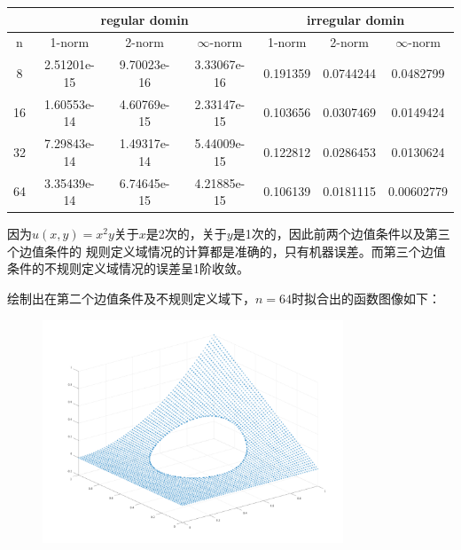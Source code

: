 \documentclass[a4paper,11.5pt,UTF8]{ctexart}
\begin{document}
\begin{large}
\begin{center}
\begin{tabular}{|c|c|c|c|c|c|c|}
	\hline
	& \multicolumn{3}{c|}{regular domin} & \multicolumn{3}{c|}{irregular domin} \\
	\hline
	n & 1-norm & 2-norm & $\infty$-norm & 1-norm &	2-norm& $\infty$-norm \\
	\hline
	8& 2.51201e-15& 9.70023e-16 &3.33067e-16 & 0.191359 & 0.0744244 & 0.0482799 \\
	\hline
	16& 1.60553e-14 & 4.60769e-15 & 2.33147e-15 & 0.103656 &0.0307469&0.0149424\\
	\hline
	32&7.29843e-14& 1.49317e-14 & 5.44009e-15 & 0.122812&0.0286453&0.0130624\\
	\hline
	64& 3.35439e-14 & 6.74645e-15 & 4.21885e-15 &0.106139&0.0181115&0.00602779 \\
	\hline
\end{tabular}
\end{center}
\par 因为$u(x,y)=x^2y$关于$x$是2次的，关于$y$是1次的，因此前两个边值条件以及第三个边值条件的
规则定义域情况的计算都是准确的，只有机器误差。而第三个边值条件的不规则定义域情况的误差呈1阶收敛。
\par 绘制出在第二个边值条件及不规则定义域下，$n=64$时拟合出的函数图像如下：
\begin{figure}[H]
	\centering
	\includegraphics[width=0.8\textwidth,height=0.6\textwidth]{../output/image/image3.png}
\end{figure}



\end{large}
\end{document}
